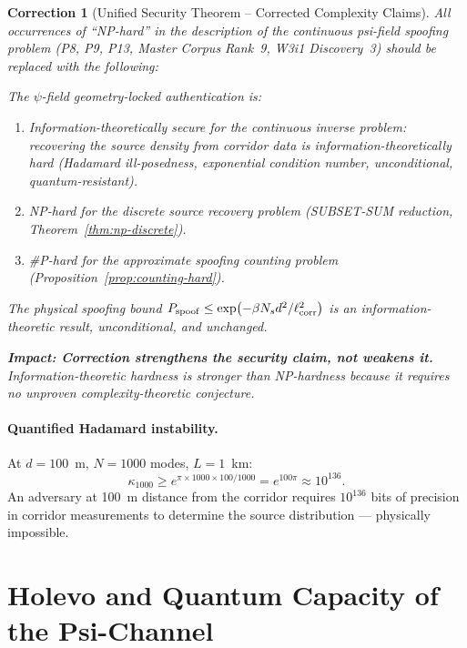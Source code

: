 \documentclass[aps,prd,twocolumn,superscriptaddress,nofootinbib]{revtex4-2}
\newtheorem{correction}{Correction}
\begin{document}
\begin{correction}[Unified Security Theorem -- Corrected Complexity Claims]
\label{cor:security}
All occurrences of ``NP-hard'' in the description of the continuous
psi-field spoofing problem (P8, P9, P13, Master Corpus Rank~9,
W3i1 Discovery~3) should be replaced with the following:

\emph{The $\psi$-field geometry-locked authentication is:}
\begin{enumerate}
\item \emph{Information-theoretically secure for the continuous inverse
problem: recovering the source density from corridor data is information-theoretically
hard (Hadamard ill-posedness, exponential condition number, unconditional,
quantum-resistant).}
\item \emph{NP-hard for the discrete source recovery problem (SUBSET-SUM
reduction, Theorem~\ref{thm:np-discrete}).}
\item \emph{\#P-hard for the approximate spoofing counting problem
(Proposition~\ref{prop:counting-hard}).}
\end{enumerate}

The physical spoofing bound
$P_{\rm spoof} \leq \exp(-\beta N_s d^2/\ell_{\rm corr}^2)$
is an information-theoretic result, unconditional, and unchanged.

\textbf{Impact: Correction strengthens the security claim, not weakens it.}
Information-theoretic hardness is stronger than NP-hardness because it
requires no unproven complexity-theoretic conjecture.
\end{correction}

\paragraph{Quantified Hadamard instability.}
At $d = 100$~m, $N = 1000$ modes, $L = 1$~km:
\begin{equation}
\kappa_{1000} \geq e^{\pi \times 1000 \times 100/1000} = e^{100\pi} \approx 10^{136}.
\end{equation}
An adversary at 100~m distance from the corridor requires $10^{136}$ bits
of precision in corridor measurements to determine the source distribution
--- physically impossible.

\section{Holevo and Quantum Capacity of the Psi-Channel}
\label{sec:quantum-cap}
\end{document}
